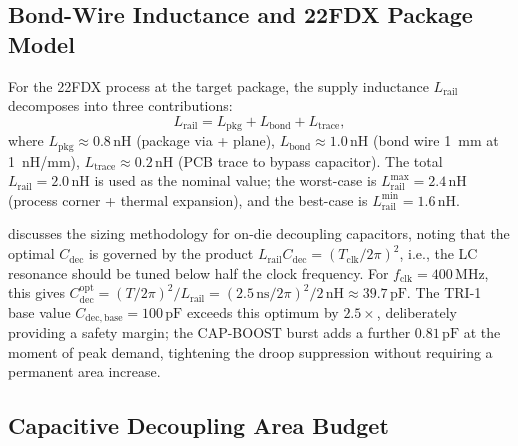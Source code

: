 \documentclass[12pt,a4paper]{report}
\theoremstyle{plain}
\theoremstyle{definition}
\theoremstyle{remark}
\newcommand{\Lrail}{L_{\mathrm{rail}}}
\newcommand{\Cdec}{C_{\mathrm{dec}}}
\newcommand{\Cbase}{C_{\mathrm{dec,base}}}
\newcommand{\fclk}{f_{\mathrm{clk}}}
\begin{document}
\subsection{Bond-Wire Inductance and 22FDX Package Model}
\label{ssec:bond-wire}

For the 22FDX process at the target package, the supply inductance
$\Lrail$ decomposes into three contributions:
\begin{equation}
  \Lrail = L_{\mathrm{pkg}} + L_{\mathrm{bond}} + L_{\mathrm{trace}},
\end{equation}
where $L_{\mathrm{pkg}} \approx 0.8\,\mathrm{nH}$ (package via + plane),
$L_{\mathrm{bond}} \approx 1.0\,\mathrm{nH}$ (bond wire 1~mm at 1~nH/mm),
$L_{\mathrm{trace}} \approx 0.2\,\mathrm{nH}$ (PCB trace to bypass capacitor).
The total $\Lrail = 2.0\,\mathrm{nH}$ is used as the nominal value; the
worst-case is $\Lrail^{\max} = 2.4\,\mathrm{nH}$ (process corner + thermal
expansion), and the best-case is $\Lrail^{\min} = 1.6\,\mathrm{nH}$.

\citep{rabaey_2003} discusses the sizing methodology for on-die decoupling
capacitors, noting that the optimal $\Cdec$ is governed by the product
$\Lrail \Cdec = (T_{\mathrm{clk}} / 2\pi)^{2}$, i.e., the LC resonance
should be tuned below half the clock frequency.
For $\fclk = 400\,\mathrm{MHz}$, this gives
$\Cdec^{\mathrm{opt}} = (T/2\pi)^{2} / \Lrail
   = (2.5\,\mathrm{ns}/2\pi)^{2} / 2\,\mathrm{nH}
   \approx 39.7\,\mathrm{pF}$.
The TRI-1 base value $\Cbase = 100\,\mathrm{pF}$ exceeds this optimum by
$2.5\times$, deliberately providing a safety margin; the CAP-BOOST burst
adds a further $0.81\,\mathrm{pF}$ at the moment of peak demand, tightening
the droop suppression without requiring a permanent area increase.

\subsection{Capacitive Decoupling Area Budget}
\label{ssec:area-budget}
\end{document}
